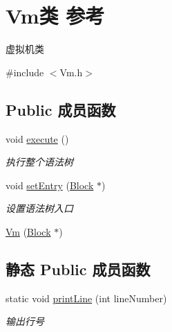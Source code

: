 \hypertarget{class_vm}{}\section{Vm类 参考}
\label{class_vm}


虚拟机类  




{\ttfamily \#include $<$Vm.\+h$>$}

\subsection*{Public 成员函数}
\begin{DoxyCompactItemize}
\item 
void \hyperlink{class_vm_a37a0791ef2b63e41421446993d0e7e4d}{execute} ()\hypertarget{class_vm_a37a0791ef2b63e41421446993d0e7e4d}{}\label{class_vm_a37a0791ef2b63e41421446993d0e7e4d}

\begin{DoxyCompactList}\small\item\em 执行整个语法树 \end{DoxyCompactList}\item 
void \hyperlink{class_vm_af036edc52fab207ca28530c06b6d0c67}{set\+Entry} (\hyperlink{class_block}{Block} $\ast$)\hypertarget{class_vm_af036edc52fab207ca28530c06b6d0c67}{}\label{class_vm_af036edc52fab207ca28530c06b6d0c67}

\begin{DoxyCompactList}\small\item\em 设置语法树入口 \end{DoxyCompactList}\item 
\hyperlink{class_vm_a4a37106b5b5b9382baa79dea901db8ba}{Vm} (\hyperlink{class_block}{Block} $\ast$)
\end{DoxyCompactItemize}
\subsection*{静态 Public 成员函数}
\begin{DoxyCompactItemize}
\item 
static void \hyperlink{class_vm_a376141bb4182218ac7a499043eb18a6c}{print\+Line} (int line\+Number)\hypertarget{class_vm_a376141bb4182218ac7a499043eb18a6c}{}\label{class_vm_a376141bb4182218ac7a499043eb18a6c}

\begin{DoxyCompactList}\small\item\em 输出行号 \end{DoxyCompactList}\end{DoxyCompactItemize}
